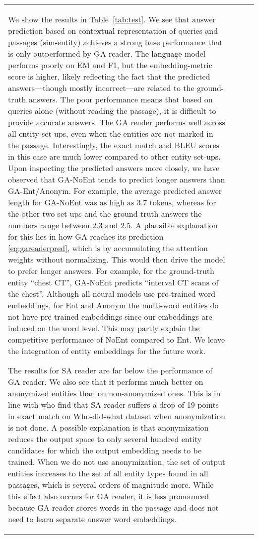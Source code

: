 \documentclass[11pt,a4paper]{article}
\begin{document}
\begin{table}[t]
\begin{tabular}{p{2.7cm} p{1.8cm} l r}
{We show the results in Table~\ref{tab:test}. We see that answer prediction based on contextual representation of queries and passages (sim-entity) achieves a strong base performance that is only outperformed by GA reader. The language model performs poorly on EM and F1, but the embedding-metric score is higher, likely reflecting the fact that the predicted answers---though mostly incorrect---are related to the ground-truth answers. The poor performance means that based on queries alone (without reading the passage), it is difficult to provide accurate answers. 
The GA reader performs well across all entity set-ups, even when the entities are not marked in the passage. Interestingly, the exact match and BLEU scores in this case are much lower compared to other entity set-ups. Upon inspecting the predicted answers more closely, we have observed that GA-NoEnt tends to predict longer answers than GA-Ent/Anonym. For example, the average predicted answer length for GA-NoEnt was as high as 3.7 tokens, whereas for the other two set-ups and the ground-truth answers the numbers range between 2.3 and 2.5. A plausible explanation for this lies in how GA reaches its prediction \eqref{eq:gareaderpred}, which is by accumulating the attention weights without normalizing. This would then drive the model to prefer longer answers. For example, for the ground-truth entity \enquote{chest CT}, GA-NoEnt predicts \enquote{interval CT scans of the chest}. Although all neural models use pre-trained word embeddings, for Ent and Anonym the multi-word entities do not have pre-trained embeddings since our embeddings are induced on the word level. This may partly explain the competitive performance of NoEnt compared to Ent. We leave the integration of entity embeddings for the future work. 



The results for SA reader are far below the performance of GA reader. We also see that it performs much better on anonymized entities than on non-anonymized ones. This is in line with \citet{WangEtAl2017} who find that SA reader suffers a drop of 19 points in exact match on Who-did-what dataset when anonymization is not done. A possible explanation is that anonymization reduces the output space to only several hundred entity candidates for which the output embedding needs to be trained. When we do not use anonymization, the set of output entities increases to the set of all entity types found in all passages, which is several orders of magnitude more. While this effect also occurs for GA reader, it is less pronounced because GA reader scores words in the passage and does not need to learn separate answer word embeddings.

}
\end{tabular}
\end{table}
\end{document}
